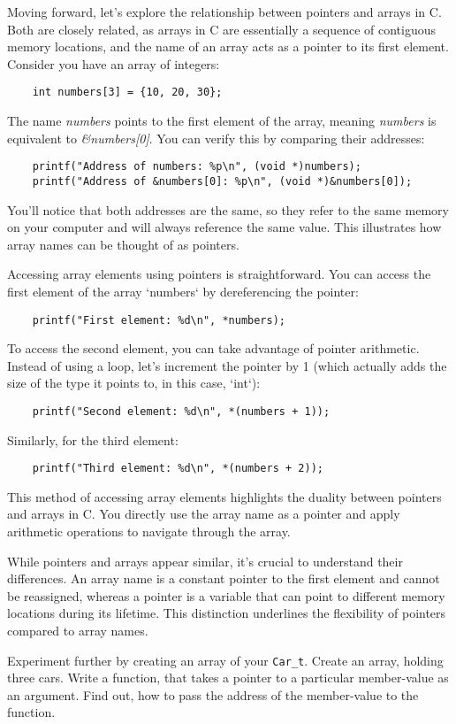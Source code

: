 \documentclass{dcbl/challenge}
\begin{document}
\begin{aufgabe}
    Moving forward, let's explore the relationship between pointers and arrays in C. Both are closely related, as arrays in C are essentially a sequence of contiguous memory locations, and the name of an array acts as a pointer to its first element.
    Consider you have an array of integers:
\begin{lstlisting}
    int numbers[3] = {10, 20, 30};
\end{lstlisting}
The name \emph{numbers} points to the first element of the array, meaning \emph{numbers} is equivalent to \emph{\&numbers[0]}. You can verify this by comparing their addresses:
\begin{lstlisting}
    printf("Address of numbers: %p\n", (void *)numbers);
    printf("Address of &numbers[0]: %p\n", (void *)&numbers[0]);
\end{lstlisting}
You'll notice that both addresses are the same, so they refer to the same memory on your computer and will always reference the same value. This illustrates how array names can be thought of as pointers.

Accessing array elements using pointers is straightforward. You can access the first element of the array `numbers` by dereferencing the pointer:
\begin{lstlisting}
    printf("First element: %d\n", *numbers);
\end{lstlisting}
To access the second element, you can take advantage of pointer arithmetic. Instead of using a loop, let's increment the pointer by 1 (which actually adds the size of the type it points to, in this case, `int`):
\begin{lstlisting}
    printf("Second element: %d\n", *(numbers + 1));
\end{lstlisting}
Similarly, for the third element:
\begin{lstlisting}
    printf("Third element: %d\n", *(numbers + 2));
\end{lstlisting}
This method of accessing array elements highlights the duality between pointers and arrays in C. You directly use the array name as a pointer and apply arithmetic operations to navigate through the array.

While pointers and arrays appear similar, it's crucial to understand their differences. An array name is a constant pointer to the first element and cannot be reassigned, whereas a pointer is a variable that can point to different memory locations during its lifetime. This distinction underlines the flexibility of pointers compared to array names.

Experiment further by creating an array of your \texttt{Car\_t}. 
Create an array, holding three cars. 
Write a function, that takes a pointer to a particular member-value as an argument.
Find out, how to pass the address of the member-value to the function.

\end{aufgabe}
\end{document}
